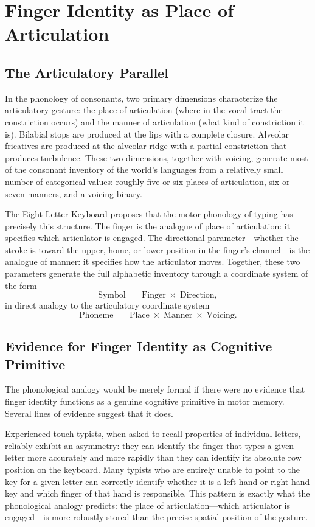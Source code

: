 \documentclass[12pt,a4paper]{article}
\theoremstyle{plain}
\theoremstyle{definition}
\theoremstyle{remark}
\begin{document}
\section{Finger Identity as Place of Articulation}

\subsection{The Articulatory Parallel}

In the phonology of consonants, two primary dimensions characterize the
articulatory gesture: the place of articulation (where in the vocal tract
the constriction occurs) and the manner of articulation (what kind of
constriction it is). Bilabial stops are produced at the lips with a complete
closure. Alveolar fricatives are produced at the alveolar ridge with a partial
constriction that produces turbulence. These two dimensions, together with
voicing, generate most of the consonant inventory of the world's languages from
a relatively small number of categorical values: roughly five or six places of
articulation, six or seven manners, and a voicing binary.

The Eight-Letter Keyboard proposes that the motor phonology of typing has
precisely this structure. The finger is the analogue of place of articulation:
it specifies which articulator is engaged. The directional parameter---whether
the stroke is toward the upper, home, or lower position in the finger's
channel---is the analogue of manner: it specifies how the articulator moves.
Together, these two parameters generate the full alphabetic inventory through
a coordinate system of the form
\[
  \text{Symbol} \;=\; \text{Finger} \;\times\; \text{Direction},
\]
in direct analogy to the articulatory coordinate system
\[
  \text{Phoneme} \;=\; \text{Place} \;\times\; \text{Manner} \;\times\; \text{Voicing}.
\]

\subsection{Evidence for Finger Identity as Cognitive Primitive}

The phonological analogy would be merely formal if there were no evidence that
finger identity functions as a genuine cognitive primitive in motor memory.
Several lines of evidence suggest that it does.

Experienced touch typists, when asked to recall properties of individual
letters, reliably exhibit an asymmetry: they can identify the finger that
types a given letter more accurately and more rapidly than they can identify
its absolute row position on the keyboard. Many typists who are entirely
unable to point to the key for a given letter can correctly identify whether
it is a left-hand or right-hand key and which finger of that hand is responsible.
This pattern is exactly what the phonological analogy predicts: the place
of articulation---which articulator is engaged---is more robustly stored than
the precise spatial position of the gesture.
\end{document}
